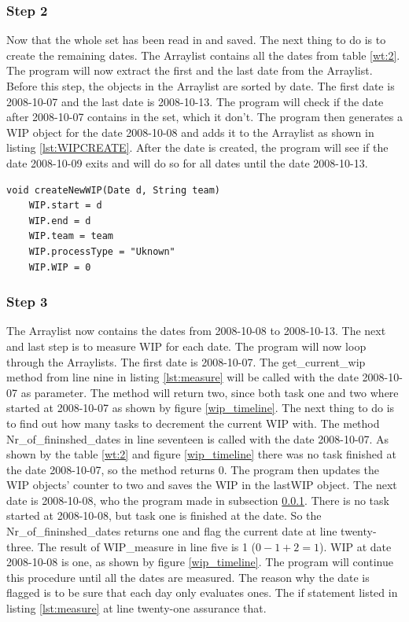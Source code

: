 \documentclass[UKenglish]{ifimaster}  %
\begin{document}
 \subsubsection{Step 2}
\label{sub:sub:st}
Now that the whole set has been read in and saved. The next thing to do is to create the remaining dates. The Arraylist contains all the dates from table \ref{wt:2}.  The program will now extract the first and the last date from the Arraylist. Before this step, the objects in the Arraylist are sorted by date. The first date is 2008-10-07 and the last date is 2008-10-13.  The program will check if the date after 2008-10-07 contains in the set, which it don't. The program then generates a WIP object for the date 2008-10-08 and adds it to the Arraylist as shown in listing \ref{lst:WIPCREATE}. After the date is created, the program will see if the date 2008-10-09 exits and will do so for all dates until the date 2008-10-13.

\begin{minipage}{\textwidth} 
\begin{lstlisting}[caption={Creating WIP-object},label={lst:WIPCREATE}]
void createNewWIP(Date d, String team) 
	WIP.start = d
	WIP.end = d
	WIP.team = team
	WIP.processType = "Uknown"
	WIP.WIP = 0
\end{lstlisting}
  \end{minipage}


\subsubsection{Step 3}
The Arraylist now contains the dates from 2008-10-08 to 2008-10-13. The next and last step is to measure WIP for each date.  The program will now loop through the Arraylists. The first date is 2008-10-07.  The get\_current\_wip method from line nine in listing \ref{lst:measure} will be called with the date 2008-10-07 as parameter.  The method will return two, since both task one and two where started at 2008-10-07 as shown by figure \ref{wip_timeline}. The next thing to do is to find out how many tasks to decrement the current WIP with.  The method Nr\_of\_fininshed\_dates in line seventeen is called with the date 2008-10-07. As shown by the table \ref{wt:2} and figure \ref{wip_timeline} there was no task finished at the date 2008-10-07, so the method returns 0. The program then updates the WIP objects' counter to two and saves the WIP in the lastWIP object. The next date is 2008-10-08, who the program made in subsection \ref{sub:sub:st}. There is no task started at 2008-10-08, but task one is finished at the date. So the Nr\_of\_fininshed\_dates returns one and flag the current date at line twenty-three. The result of WIP\_measure in line five is 1 ($0-1+2=1$). WIP at date 2008-10-08 is one, as shown by figure \ref{wip_timeline}. The program will continue this procedure until all the dates are measured.  The reason why the date is flagged is to be sure that each day only evaluates ones. The if statement listed in listing \ref{lst:measure} at line twenty-one assurance that.
\end{document}
